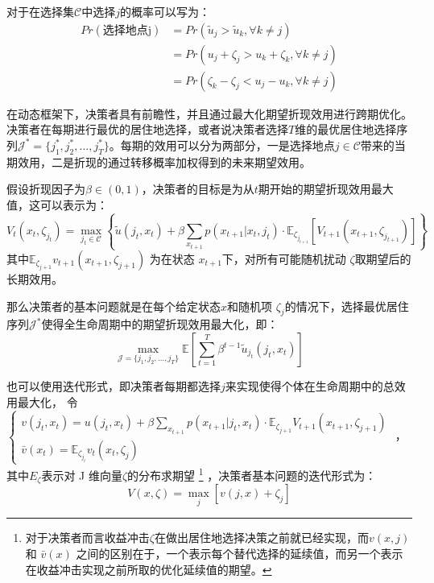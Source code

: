 \documentclass[a4paper, zihao=-4, fontset = mac, oneside]{ctexbook} %
\let\oldfootnote\footnote
\renewcommand{\footnote}[1]{%
  \oldfootnote{\setstretch{1.5}#1}%
}
\begin{document}
对于在选择集$\mathcal{C}$中选择$j$的概率可以写为：
\begin{equation}
\begin{split}
  Pr(\text{选择地点j})&=Pr(\tilde u_j > \tilde u_k, \forall k \neq j)
  \\&=Pr(u_j+\zeta_j>u_k+\zeta_k, \forall k \neq j)
  \\&=Pr(\zeta_k-\zeta_j<u_j-u_k, \forall k \neq j)
\end{split}
\label{eq:C中地点选择j的概率}
\end{equation}

在动态框架下，决策者具有前瞻性，并且通过最大化期望折现效用进行跨期优化。决策者在每期进行最优的居住地选择，或者说决策者选择$T$维的最优居住地选择序列$\mathcal{J}^*=\{j_1^*,j_2^*,\ldots,j_T^*\}$。每期的效用可以分为两部分，一是选择地点$j \in \mathcal{C}$带来的当期效用，二是折现的通过转移概率加权得到的未来期望效用。

假设折现因子为$\beta \in (0,1)$，决策者的目标是为从$t$期开始的期望折现效用最大值，这可以表示为：
\begin{equation}
  V_t(x_t, \zeta_{j_t}) = \max_{j_t \in \mathcal{C}} 
  \left\{ 
  \tilde{u}(j_t, x_t) + \beta \sum_{x_{t+1}} p(x_{t+1} | x_t, j_t) \cdot \mathbb{E}_{\zeta_{j_{t+1}}} [ V_{t+1}(x_{t+1}, \zeta_{j_{t+1}}) ]
  \right\}
\end{equation}
其中$\mathbb{E}_{\zeta_{j+1}} v_{t+1}(x_{t+1},\zeta_{j+1})$
为在状态 
$x_{t+1}$下，对所有可能随机扰动 
$\zeta$取期望后的长期效用。

那么决策者的基本问题就是在每个给定状态$x$和随机项 $\zeta_j$的情况下，选择最优居住序列$\mathcal{J}^*$使得全生命周期中的期望折现效用最大化，即：
\begin{equation}
  \max_{\mathcal{J}=\{j_1,j_2,\ldots,j_T\}} \mathbb{E} [ \sum_{t=1}^{T} \beta^{t-1} \tilde{u}_{j_t}(j_t,x_t) ]
\end{equation}

也可以使用迭代形式，即决策者每期都选择$j$来实现使得个体在生命周期中的总效用最大化，
令
$\begin{cases}
  v(j_{t},x_{t})=u(j_{t} ,x_{t})+\beta \sum_{x_{t+1}} p(x_{t+1}|j_t,x_t) \cdot \mathbb{E}_{\zeta_{j+1}} V_{t+1}(x_{t+1},\zeta_{j+1})
  \\
  \bar v(x_{t})=\mathbb{E}_{\zeta_{j_t}} v_{t}(x_{t},\zeta_{j})
\end{cases}$
，其中$E_{\zeta}$表示对 J 维向量$\zeta$的分布求期望\footnote{对于决策者而言收益冲击$\zeta$在做出居住地选择决策之前就已经实现，而$v(x,j)$ 和 $\bar v(x)$ 之间的区别在于，一个表示每个替代选择的延续值，而另一个表示在收益冲击实现之前所取的优化延续值的期望。}，决策者基本问题的迭代形式为：
\begin{equation}
V(x,\zeta)=\max\limits_{j}[v(j,x)+\zeta_{j}]
\end{equation}
\end{document}
